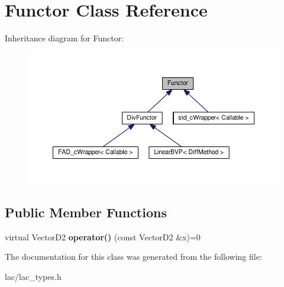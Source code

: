 \hypertarget{classFunctor}{}\section{Functor Class Reference}
\label{classFunctor}


Inheritance diagram for Functor\+:
\nopagebreak
\begin{figure}[H]
\begin{center}
\leavevmode
\includegraphics[width=350pt]{classFunctor__inherit__graph}
\end{center}
\end{figure}
\subsection*{Public Member Functions}
\begin{DoxyCompactItemize}
\item 
\mbox{\label{classFunctor_a79e7aeb507e6d8715c1dde8f5c0d598b}} 
virtual Vector\+D2 {\bfseries operator()} (const Vector\+D2 \&x)=0
\end{DoxyCompactItemize}


The documentation for this class was generated from the following file\+:\begin{DoxyCompactItemize}
\item 
lac/lac\+\_\+types.\+h\end{DoxyCompactItemize}
